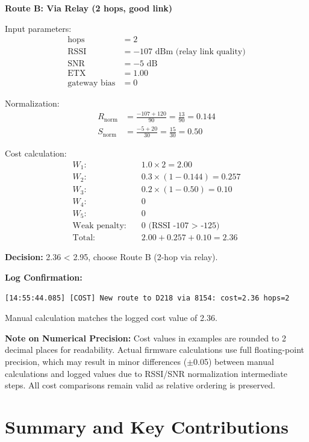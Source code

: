 \textbf{Route B: Via Relay (2 hops, good link)}

Input parameters:
\begin{align*}
\text{hops} &= 2 \\
\text{RSSI} &= -107 \text{ dBm (relay link quality)} \\
\text{SNR} &= -5 \text{ dB} \\
\text{ETX} &= 1.00 \\
\text{gateway bias} &= 0
\end{align*}

Normalization:
\begin{align*}
R_{\text{norm}} &= \frac{-107 + 120}{90} = \frac{13}{90} = 0.144 \\
S_{\text{norm}} &= \frac{-5 + 20}{30} = \frac{15}{30} = 0.50
\end{align*}

Cost calculation:
\begin{align*}
W_1: &\quad 1.0 \times 2 = 2.00 \\
W_2: &\quad 0.3 \times (1 - 0.144) = 0.257 \\
W_3: &\quad 0.2 \times (1 - 0.50) = 0.10 \\
W_4: &\quad 0 \\
W_5: &\quad 0 \\
\text{Weak penalty:} &\quad 0 \text{ (RSSI -107 > -125)} \\
\text{Total:} &\quad 2.00 + 0.257 + 0.10 = 2.36
\end{align*}

\textbf{Decision:} 2.36 < 2.95, choose Route B (2-hop via relay).

\textbf{Log Confirmation:}
\begin{verbatim}
[14:55:44.085] [COST] New route to D218 via 8154: cost=2.36 hops=2
\end{verbatim}

Manual calculation matches the logged cost value of 2.36.

\textbf{Note on Numerical Precision:} Cost values in examples are rounded to 2 decimal places for readability. Actual firmware calculations use full floating-point precision, which may result in minor differences ($\pm$0.05) between manual calculations and logged values due to RSSI/SNR normalization intermediate steps. All cost comparisons remain valid as relative ordering is preserved.

\section{Summary and Key Contributions}

